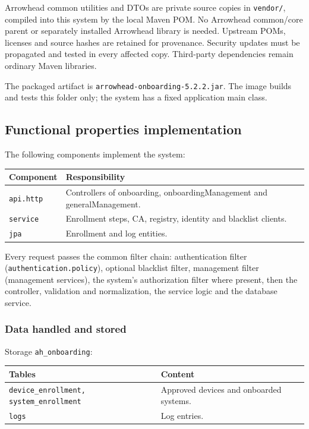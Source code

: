 \documentclass[a4paper]{arrowhead}
\begin{document}
Arrowhead common utilities and DTOs are private source copies in \texttt{vendor/}, compiled into this system by the local Maven POM. No Arrowhead common/core parent or separately installed Arrowhead library is needed. Upstream POMs, licenses and source hashes are retained for provenance. Security updates must be propagated and tested in every affected copy. Third-party dependencies remain ordinary Maven libraries.

The packaged artifact is \texttt{arrowhead-\allowbreak{}onboarding-5.2.2.jar}. The image builds and tests this folder only; the system has a fixed application main class.

\subsection{Functional properties implementation}

The following components implement the system:

\noindent\begin{longtable}{| p{5.6cm} | p{9.6cm} |} \hline
\rowcolor{gray!33} Component & Responsibility \\ \hline \endhead
\texttt{api.\allowbreak{}http} & Controllers of onboarding, onboarding\allowbreak{}Management and generalManagement. \\ \hline
\texttt{service} & Enrollment steps, CA, registry, identity and blacklist clients. \\ \hline
\texttt{jpa} & Enrollment and log entities. \\ \hline
\end{longtable}

Every request passes the common filter chain: authentication filter (\texttt{authentication.\allowbreak{}policy}), optional blacklist filter, management filter (management services), the system's authorization filter where present, then the controller, validation and normalization, the service logic and the database service.

\subsubsection{Data handled and stored}

Storage \texttt{ah\_\allowbreak{}onboarding}:

\noindent\begin{longtable}{| p{6.4cm} | p{8.8cm} |} \hline
\rowcolor{gray!33} Tables & Content \\ \hline \endhead
\texttt{device\_\allowbreak{}enrollment,\allowbreak{} system\_\allowbreak{}enrollment} & Approved devices and onboarded systems. \\ \hline
\texttt{logs} & Log entries. \\ \hline
\end{longtable}
\end{document}
